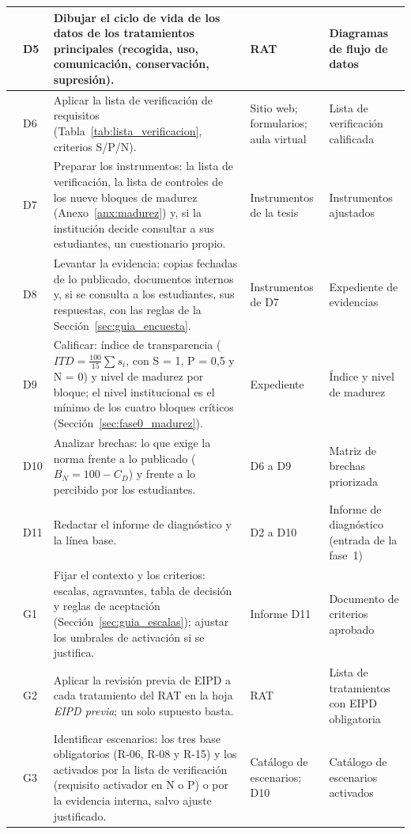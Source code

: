 {\begin{xltabular}{\textwidth}{|>{\raggedright\arraybackslash}p{0.7cm}|>{\raggedright\arraybackslash}p{0.8cm}|L|>{\raggedright\arraybackslash}p{2.5cm}|>{\raggedright\arraybackslash}p{2.6cm}|}
  0 & D5 & Dibujar el ciclo de vida de los datos de los tratamientos principales (recogida, uso, comunicación, conservación, supresión). & RAT & Diagramas de flujo de datos \\  & D6 & Aplicar la lista de verificación de requisitos (Tabla~\ref{tab:lista_verificacion}, criterios S/P/N). & Sitio web; formularios; aula virtual & Lista de verificación calificada \\  & D7 & Preparar los instrumentos: la lista de verificación, la lista de controles de los nueve bloques de madurez (Anexo~\ref{anx:madurez}) y, si la institución decide consultar a sus estudiantes, un cuestionario propio. & Instrumentos de la tesis & Instrumentos ajustados \\  & D8 & Levantar la evidencia: copias fechadas de lo publicado, documentos internos y, si se consulta a los estudiantes, sus respuestas, con las reglas de la Sección~\ref{sec:guia_encuesta}. & Instrumentos de D7 & Expediente de evidencias \\  & D9 & Calificar: índice de transparencia ($ITD = \frac{100}{15}\sum s_i$, con S = 1, P = 0,5 y N = 0) y nivel de madurez por bloque; el nivel institucional es el mínimo de los cuatro bloques críticos (Sección~\ref{sec:fase0_madurez}). & Expediente & Índice y nivel de madurez \\  & D10 & Analizar brechas: lo que exige la norma frente a lo publicado ($B_N = 100 - C_D$) y frente a lo percibido por los estudiantes. & D6 a D9 & Matriz de brechas priorizada \\  & D11 & Redactar el informe de diagnóstico y la línea base. & D2 a D10 & Informe de diagnóstico (entrada de la fase~1) \\  & G1 & Fijar el contexto y los criterios: escalas, agravantes, tabla de decisión y reglas de aceptación (Sección~\ref{sec:guia_escalas}); ajustar los umbrales de activación si se justifica. & Informe D11 & Documento de criterios aprobado \\  & G2 & Aplicar la revisión previa de EIPD a cada tratamiento del RAT en la hoja \textit{EIPD previa}; un solo supuesto basta. & RAT & Lista de tratamientos con EIPD obligatoria \\  & G3 & Identificar escenarios: los tres base obligatorios (R-06, R-08 y R-15) y los activados por la lista de verificación (requisito activador en N o P) o por la evidencia interna, salvo ajuste justificado. & Catálogo de escenarios; D10 & Catálogo de escenarios activados \\ \hline

\end{xltabular}}
